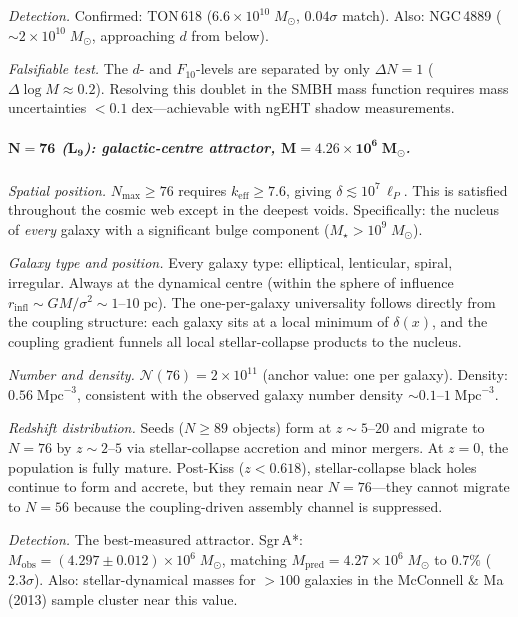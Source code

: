 \documentclass[12pt,a4paper]{article}
\begin{document}
\textit{Detection.}\; Confirmed: TON\,618 ($6.6 \times 10^{10}\;M_\odot$, $0.04\sigma$ match).  Also: NGC\,4889 ($\sim 2 \times 10^{10}\;M_\odot$, approaching $d$ from below).

\textit{Falsifiable test.}\; The $d$- and $F_{10}$-levels are separated by only $\Delta N = 1$ ($\Delta\log M \approx 0.2$).  Resolving this doublet in the SMBH mass function requires mass uncertainties $<0.1\;\mathrm{dex}$---achievable with ngEHT shadow measurements.

\subparagraph{$\boldsymbol{N = 76}$ ($\boldsymbol{L_9}$): galactic-centre attractor, $\boldsymbol{M = 4.26 \times 10^{6}\;M_\odot}$.}

\textit{Spatial position.}\; $N_{\max} \geq 76$ requires $k_{\mathrm{eff}} \geq 7.6$, giving $\delta \lesssim 10^7\,\ell_P$.  This is satisfied throughout the cosmic web except in the deepest voids.  Specifically: the nucleus of \emph{every} galaxy with a significant bulge component ($M_\star > 10^{9}\;M_\odot$).

\textit{Galaxy type and position.}\; Every galaxy type: elliptical, lenticular, spiral, irregular.  Always at the dynamical centre (within the sphere of influence $r_{\mathrm{infl}} \sim GM/\sigma^2 \sim 1$--$10\;\mathrm{pc}$).  The one-per-galaxy universality follows directly from the coupling structure: each galaxy sits at a local minimum of $\delta(x)$, and the coupling gradient funnels all local stellar-collapse products to the nucleus.

\textit{Number and density.}\; $\mathcal{N}(76) = 2 \times 10^{11}$ (anchor value: one per galaxy).  Density: $0.56\;\mathrm{Mpc}^{-3}$, consistent with the observed galaxy number density $\sim 0.1$--$1\;\mathrm{Mpc}^{-3}$.

\textit{Redshift distribution.}\; Seeds ($N \geq 89$ objects) form at $z \sim 5$--$20$ and migrate to $N = 76$ by $z \sim 2$--$5$ via stellar-collapse accretion and minor mergers.  At $z = 0$, the population is fully mature.  Post-Kiss ($z < 0.618$), stellar-collapse black holes continue to form and accrete, but they remain near $N = 76$---they cannot migrate to $N = 56$ because the coupling-driven assembly channel is suppressed.

\textit{Detection.}\; The best-measured attractor.  Sgr\,A*: $M_{\mathrm{obs}} = (4.297 \pm 0.012) \times 10^6\;M_\odot$, matching $M_{\mathrm{pred}} = 4.27 \times 10^6\;M_\odot$ to $0.7\%$ ($2.3\sigma$).  Also: stellar-dynamical masses for $>100$ galaxies in the McConnell \& Ma (2013) sample cluster near this value.
\end{document}
